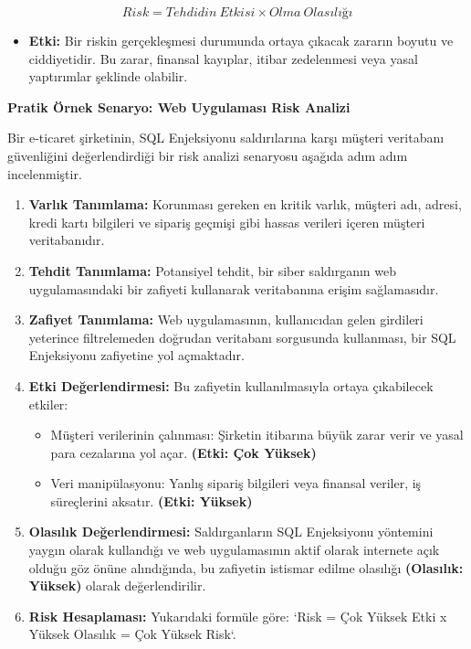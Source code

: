 $$Risk = Tehdidin\ Etkisi \times Olma\ Olasılığı$$

\begin{itemize}
    \item \textbf{Etki:} Bir riskin gerçekleşmesi durumunda ortaya çıkacak zararın boyutu ve ciddiyetidir. Bu zarar, finansal kayıplar, itibar zedelenmesi veya yasal yaptırımlar şeklinde olabilir.
\end{itemize}

\textbf{Pratik Örnek Senaryo: Web Uygulaması Risk Analizi}

Bir e-ticaret şirketinin, SQL Enjeksiyonu saldırılarına karşı müşteri veritabanı güvenliğini değerlendirdiği bir risk analizi senaryosu aşağıda adım adım incelenmiştir.

\begin{enumerate}
    \item \textbf{Varlık Tanımlama:} Korunması gereken en kritik varlık, müşteri adı, adresi, kredi kartı bilgileri ve sipariş geçmişi gibi hassas verileri içeren müşteri veritabanıdır.
    \item \textbf{Tehdit Tanımlama:} Potansiyel tehdit, bir siber saldırganın web uygulamasındaki bir zafiyeti kullanarak veritabanına erişim sağlamasıdır.
    \item \textbf{Zafiyet Tanımlama:} Web uygulamasının, kullanıcıdan gelen girdileri yeterince filtrelemeden doğrudan veritabanı sorgusunda kullanması, bir SQL Enjeksiyonu zafiyetine yol açmaktadır.
    \item \textbf{Etki Değerlendirmesi:} Bu zafiyetin kullanılmasıyla ortaya çıkabilecek etkiler:
    \begin{itemize}
        \item Müşteri verilerinin çalınması: Şirketin itibarına büyük zarar verir ve yasal para cezalarına yol açar. \textbf{(Etki: Çok Yüksek)}
        \item Veri manipülasyonu: Yanlış sipariş bilgileri veya finansal veriler, iş süreçlerini aksatır. \textbf{(Etki: Yüksek)}
    \end{itemize}
    \item \textbf{Olasılık Değerlendirmesi:} Saldırganların SQL Enjeksiyonu yöntemini yaygın olarak kullandığı ve web uygulamasının aktif olarak internete açık olduğu göz önüne alındığında, bu zafiyetin istismar edilme olasılığı \textbf{(Olasılık: Yüksek)} olarak değerlendirilir.
    \item \textbf{Risk Hesaplaması:} Yukarıdaki formüle göre: `Risk = Çok Yüksek Etki x Yüksek Olasılık = Çok Yüksek Risk`.
\end{enumerate}

